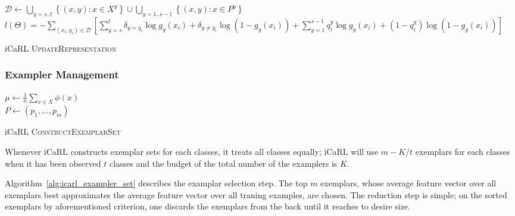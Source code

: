 \begin{algorithm}[ht]

  $\mathcal{D} \leftarrow \bigcup\limits_{y=s..t}\left\{ (x,y) : x \in X^y \right\} \cup \bigcup\limits_{y=1..s-1}\left\{ (x,y) : x \in P^y \right\} $  \\
$l(\Theta) = - \sum\limits_{\left(x_i,y_i\right) \in \mathcal{D}} \left[ \sum\limits_{y=s}^t \delta_{y=y_i}\log g_y(x_i) + \delta_{y\neq y_i}\log \left(1-g_y(x_i)\right) + \sum\limits_{y=1}^{s-1} q_{i}^y\log g_y(x_i) + (1-q_i^y)\log \left(1-g_y(x_i)\right) \right]$ 

\caption{ iCaRL \textsc{UpdateRepresentation} \label{alg:icarl_update}}
\end{algorithm}

\subsubsection{Exampler Management}
\label{sec:icarl_exampler}

\begin{algorithm}[ht]

  $\mu \leftarrow \frac{1}{n}\sum\limits_{x\in X} \phi(x)$  \\
  $P \leftarrow (p_1, ..., p_m)$

\caption {iCaRL \textsc{ConstructExemplarSet} \label{alg:icarl_exampler_set}}
\end{algorithm}

Whenever iCaRL constructs exemplar sets for each classes, it treats all classes equally; iCaRL will use $m - K/t$ exemplars for each classes when it has been observed $t$ classes and the budget of the total number of the examplers is $K$.

Algorithm~\ref{alg:icarl_exampler_set} describes the examplar selection step. The top $m$ exemplars, whose average feature vector over all exemplars best approximates the average feature vector over all traning examples, are chosen. The reduction step is simple; on the sorted exemplars by aforementioned criterion, one discards the exemplars from the back until it reaches to desire size.

